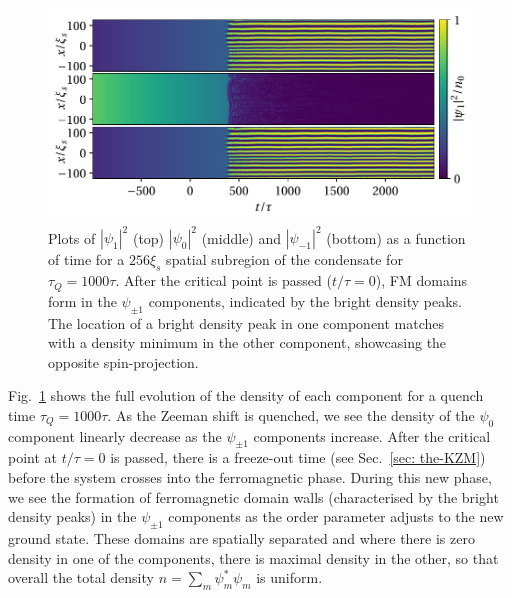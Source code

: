 \begin{figure}[tb]
    \centering
    \includegraphics[width=\textwidth]{gfx/ch-spin1/BA-FM_all_densities.pdf}
    \caption[Component densities of the system as a function of time]
    {\label{fig: BA-FM-densities}
    Plots of \(|\psi_1|^2\) (top) \(|\psi_0|^2\) (middle) and
        \(|\psi_{-1}|^2\) (bottom) as a function of time for a \(256\xi_s\)
        spatial subregion of the condensate for
        \( \tau_Q=1000\tau \).
        After the critical point is passed (\(t/\tau=0\)), FM domains form in
        the \(\psi_{\pm 1}\) components, indicated by the bright density peaks.
        The location of a bright density peak in one component matches with a
        density minimum in the other component, showcasing the opposite
        spin-projection.}
\end{figure}
Fig.~\ref{fig: BA-FM-densities} shows the full evolution of the density of each
component for a quench time \( \tau_Q=1000\tau \).
As the Zeeman shift is quenched, we see the density of the \(\psi_0\) component
linearly decrease as the \(\psi_{\pm 1}\) components increase.
After the critical point at \(t/\tau=0\) is passed, there is a freeze-out time
(see Sec.~\ref{sec: the-KZM}) before the system crosses into the ferromagnetic
phase.
During this new phase, we see the formation of ferromagnetic domain walls
(characterised by the bright density peaks) in the \(\psi_{\pm 1}\) components
as the order parameter adjusts to the new ground state.
These domains are spatially separated and where there is zero density in one of
the components, there is maximal density in the other, so that overall the total
density \(n=\sum_m\psi_m^*\psi_m\) is uniform.

